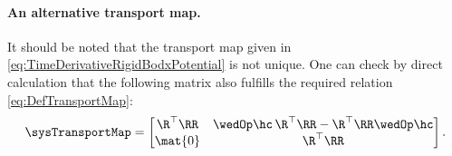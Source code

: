 
\paragraph{An alternative transport map.}
It should be noted that the transport map given in \eqref{eq:TimeDerivativeRigidBodxPotential} is not unique.
One can check by direct calculation that the following matrix also fulfills the required relation \eqref{eq:DefTransportMap}:
\begin{align}\label{eq:RigidBodyAlternativeTransportMap}
 \sysTransportMap = \begin{bmatrix} \R^\top\RR & \wedOp\hc\,\R^\top\RR - \R^\top\RR \wedOp\hc \\ \mat{0} & \R^\top\RR \end{bmatrix}.
\end{align}

